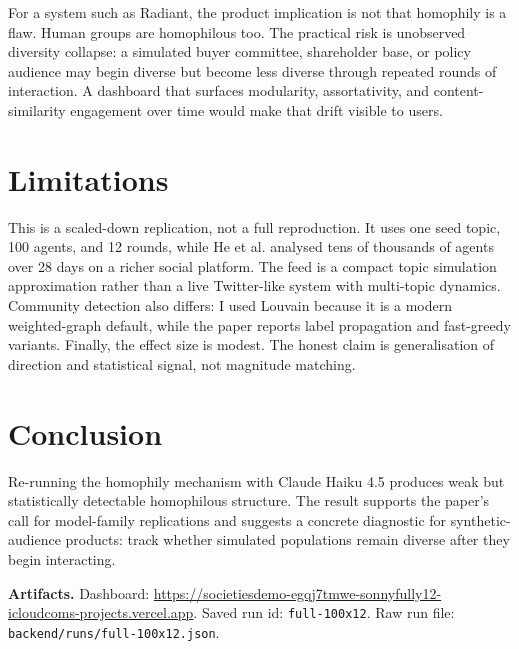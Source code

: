 \documentclass[10pt]{article}
\begin{document}
For a system such as Radiant, the product implication is not that homophily is a flaw. Human groups are homophilous too. The practical risk is unobserved diversity collapse: a simulated buyer committee, shareholder base, or policy audience may begin diverse but become less diverse through repeated rounds of interaction. A dashboard that surfaces modularity, assortativity, and content-similarity engagement over time would make that drift visible to users.

\section*{Limitations}

This is a scaled-down replication, not a full reproduction. It uses one seed topic, 100 agents, and 12 rounds, while He et al. analysed tens of thousands of agents over 28 days on a richer social platform. The feed is a compact topic simulation approximation rather than a live Twitter-like system with multi-topic dynamics. Community detection also differs: I used Louvain because it is a modern weighted-graph default, while the paper reports label propagation and fast-greedy variants. Finally, the effect size is modest. The honest claim is generalisation of direction and statistical signal, not magnitude matching.

\section*{Conclusion}

Re-running the homophily mechanism with Claude Haiku 4.5 produces weak but statistically detectable homophilous structure. The result supports the paper's call for model-family replications and suggests a concrete diagnostic for synthetic-audience products: track whether simulated populations remain diverse after they begin interacting.

\vspace{0.5em}
\textbf{Artifacts.} Dashboard: \url{https://societiesdemo-egqj7tmwe-sonnyfully12-icloudcoms-projects.vercel.app}. Saved run id: \texttt{full-100x12}. Raw run file: \texttt{backend/runs/full-100x12.json}.
\end{document}
